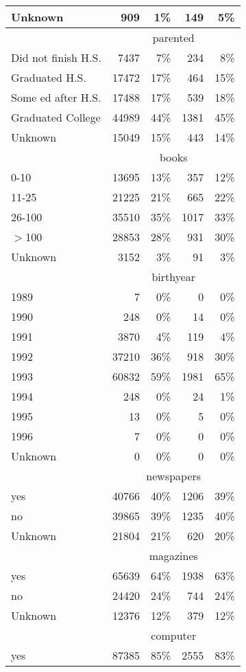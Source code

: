 \begin{longtable}{lrrrr}
  Unknown & 909 & 1\% & 149 & 5\% \\ 
   \hline & \multicolumn{4}{c}{parented} \\ \cline{2-5} Did not finish H.S. & 7437 & 7\% & 234 & 8\% \\ 
  Graduated H.S. & 17472 & 17\% & 464 & 15\% \\ 
  Some ed after H.S. & 17488 & 17\% & 539 & 18\% \\ 
  Graduated College & 44989 & 44\% & 1381 & 45\% \\ 
  Unknown & 15049 & 15\% & 443 & 14\% \\ 
   \hline & \multicolumn{4}{c}{books} \\ \cline{2-5} 0-10 & 13695 & 13\% & 357 & 12\% \\ 
  11-25 & 21225 & 21\% & 665 & 22\% \\ 
  26-100 & 35510 & 35\% & 1017 & 33\% \\ 
  $>$100 & 28853 & 28\% & 931 & 30\% \\ 
  Unknown & 3152 & 3\% &  91 & 3\% \\ 
   \hline & \multicolumn{4}{c}{birthyear} \\ \cline{2-5} 1989 &   7 & 0\% &   0 & 0\% \\ 
  1990 & 248 & 0\% &  14 & 0\% \\ 
  1991 & 3870 & 4\% & 119 & 4\% \\ 
  1992 & 37210 & 36\% & 918 & 30\% \\ 
  1993 & 60832 & 59\% & 1981 & 65\% \\ 
  1994 & 248 & 0\% &  24 & 1\% \\ 
  1995 &  13 & 0\% &   5 & 0\% \\ 
  1996 &   7 & 0\% &   0 & 0\% \\ 
  Unknown &   0 & 0\% &   0 & 0\% \\ 
   \hline & \multicolumn{4}{c}{newspapers} \\ \cline{2-5} yes & 40766 & 40\% & 1206 & 39\% \\ 
  no & 39865 & 39\% & 1235 & 40\% \\ 
  Unknown & 21804 & 21\% & 620 & 20\% \\ 
   \hline & \multicolumn{4}{c}{magazines} \\ \cline{2-5} yes & 65639 & 64\% & 1938 & 63\% \\ 
  no & 24420 & 24\% & 744 & 24\% \\ 
  Unknown & 12376 & 12\% & 379 & 12\% \\ 
   \hline & \multicolumn{4}{c}{computer} \\ \cline{2-5} yes & 87385 & 85\% & 2555 & 83\% \\ 

\end{longtable}
